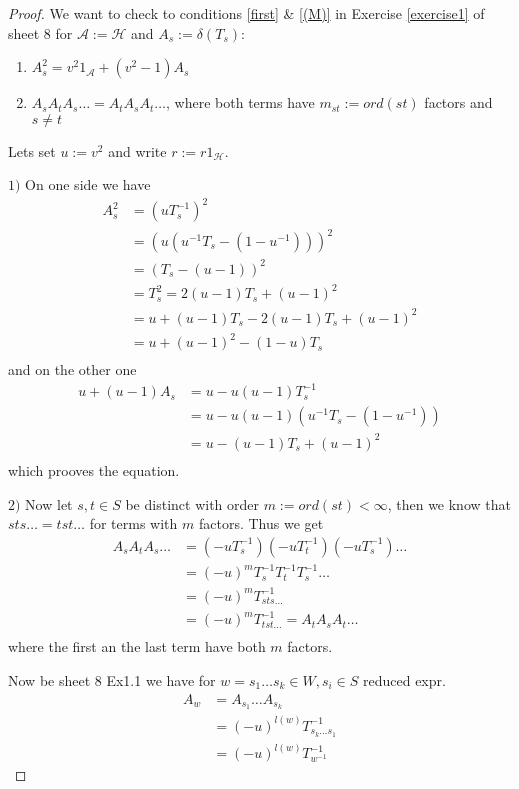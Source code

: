\documentclass[]{article}
\begin{document}
\begin{proof}
    We want to check to conditions \ref{first} \& \ref{(M)} in Exercise \ref{exercise1} of sheet 8 
    for \(\mathscr{A}:=\mathscr{H}\) and \( A_s:=\delta(T_s)\):
    \begin{enumerate}[label=\arabic*)]
        \item \(A_s^2 = v^2 1_\mathscr{A} + (v^2-1) A_s\)
        \label{first}
        \item \(A_s A_t A_s \ldots = A_t A_s A_t \dots \), where both terms have \(m_{st}:=ord(st)\) factors and \(s \neq t\)
        \label{(M)}
    \end{enumerate}
    Lets set \(u:= v^2\) and write \(r:=r 1_{\mathscr{H}}\). 

    \(1)\) On one side we have
    \begin{align*}
        A_s^2 &= (u T^{-1}_s)^2 \\
        &=(u(u^{-1}T_s - (1-u^{-1})))^2 \\
        &=(T_s - (u-1))^2 \\
        &=T_s^2 = 2(u-1)T_s + (u-1)^2 \\
        &=u + (u-1) T_s - 2(u-1) T_s + (u-1)^2 \\
        &= u + (u-1)^2 - (1-u) T_s \\
    \end{align*}
    and on the other one
    \begin{align*}
        u +(u-1)A_s &= u - u(u-1)T_s^{-1} \\
        &=u-u(u-1)(u^{-1}T_s - (1-u^{-1})) \\
        &=u - (u-1)T_s +(u-1)^2 \\
    \end{align*}
    which prooves the equation. 

    \(2)\) Now let \(s,t \in S\) be distinct with order \(m:=ord(st)< \infty\), 
    then we know that \(sts \dots = tst \dots \) for terms with \(m\) factors. Thus we get
    \begin{align*}
        A_s A_t A_s \dots &= (-uT_s^{-1})(-uT_t^{-1})(-uT_s^{-1}) \dots \\
        &=(-u)^m T_s^{-1} T_t^{-1} T_s^{-1} \dots \\
        &=(-u)^m T_{sts \dots}^{-1}  \\
        &=(-u)^m T_{tst \dots}^{-1} = A_t A_s A_t \dots  \\
    \end{align*}
    where the first an the last term have both \(m\) factors.

    Now be sheet 8 Ex1.1 we have for \(w=s_1 \dots s_k \in W, s_i \in S\) reduced expr. 
    \begin{align*}
        A_w &= A_{s_1} \dots A_{s_k} \\
        &=(-u)^{l(w)}T_{s_k \dots s_1}^{-1} \\
        &=(-u)^{l(w)}T_{w^{-1}}^{-1}
    \end{align*}
\end{proof}
\end{document}

